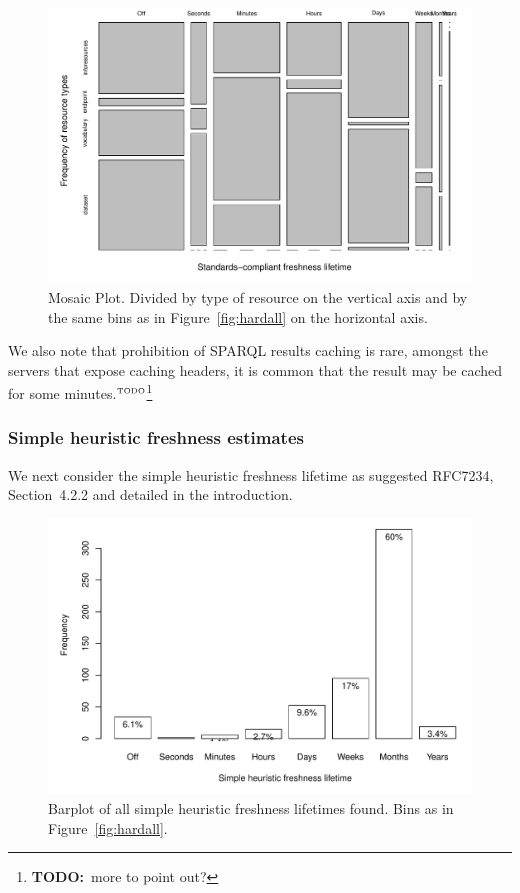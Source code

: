 \documentclass{llncs}
\newcommand{\todo}[1]{\ensuremath{^{\textrm{\tiny{TODO}\normalsize}}}\footnote{\textbf{TODO:}~#1}}
\begin{document}
\begin{figure}[ht]
  \centerline{%
    \includegraphics[width=.9\textwidth]{hardtable.pdf}}
  \caption{Mosaic Plot. Divided by type of resource on the vertical
    axis and by the same bins as in Figure~\ref{fig:hardall} on the
    horizontal axis. }
  \label{fig:hardtable}
\end{figure}


We also note that prohibition of SPARQL results caching is rare,
amongst the servers that expose caching headers, it is common
that the result may be cached for some minutes.\todo{more to point
  out?}

\subsubsection{Simple heuristic freshness estimates}\label{sec:simplefresh}

We next consider the simple heuristic freshness lifetime as suggested
RFC7234, Section~4.2.2 and detailed in the introduction.

\begin{figure}[th!]
  \centerline{%
    \includegraphics[width=.9\textwidth]{heuristicall.pdf}}
  \caption{Barplot of all simple heuristic freshness lifetimes
    found. Bins as in Figure~\ref{fig:hardall}.}
  \label{fig:heuristicall}
\end{figure}
\end{document}
